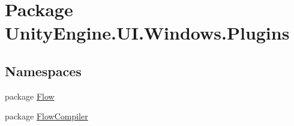 \hypertarget{namespace_unity_engine_1_1_u_i_1_1_windows_1_1_plugins}{}\section{Package Unity\+Engine.\+U\+I.\+Windows.\+Plugins}
\label{namespace_unity_engine_1_1_u_i_1_1_windows_1_1_plugins}
\subsection*{Namespaces}
\begin{DoxyCompactItemize}
\item 
package \hyperlink{namespace_unity_engine_1_1_u_i_1_1_windows_1_1_plugins_1_1_flow}{Flow}
\item 
package \hyperlink{namespace_unity_engine_1_1_u_i_1_1_windows_1_1_plugins_1_1_flow_compiler}{Flow\+Compiler}
\end{DoxyCompactItemize}
